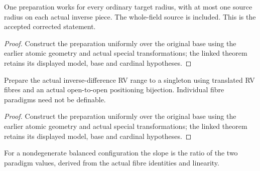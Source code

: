 \begin{lemma}

\label{s4-3}


\leanok

One preparation works for every ordinary target radius, with at most one source radius on each actual inverse piece. The whole-field source is included. This is the accepted corrected statement.

\end{lemma}

\begin{proof}


\leanok

Construct the preparation uniformly over the original base using the earlier atomic geometry and actual special transformations; the linked theorem retains its displayed model, base and cardinal hypotheses.

\end{proof}

\begin{lemma}

\label{s4-4}


\leanok

Prepare the actual inverse-difference RV range to a singleton using translated RV fibres and an actual open-to-open positioning bijection. Individual fibre paradigms need not be definable.

\end{lemma}

\begin{proof}


\leanok

Construct the preparation uniformly over the original base using the earlier atomic geometry and actual special transformations; the linked theorem retains its displayed model, base and cardinal hypotheses.

\end{proof}

\begin{lemma}

\label{s4-6}


\leanok

For a nondegenerate balanced configuration the slope is the ratio of the two paradigm values, derived from the actual fibre identities and linearity.

\end{lemma}

